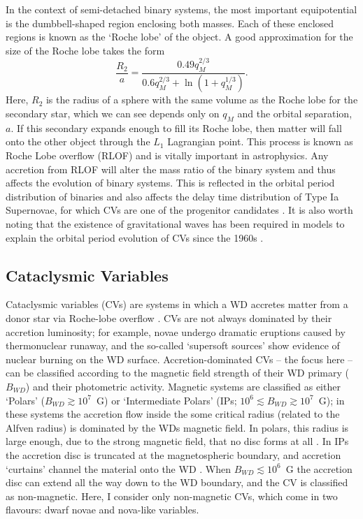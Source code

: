 In the context of semi-detached binary systems, the most important equipotential
is the dumbbell-shaped region enclosing both masses. Each of these
enclosed regions is known as the `Roche lobe' of the object. A good approximation
for the size of the Roche lobe takes the form \citep{eggleton1983}
\begin{equation}
\frac{R_2}{a} = \frac{0.49 q_M^{2/3}}{0.6q_M^{2/3} + \ln(1+q_M^{1/3})}.
\label{eq:roche2}
\end{equation} 
Here, $R_2$ is the radius of a sphere with the same volume as the Roche lobe for the
secondary star, which we can see depends only on $q_M$ and the orbital separation, 
$a$. If this secondary expands enough to fill its Roche lobe, then matter
will fall onto the other object through the $L_1$ Lagrangian point. 
This process is known as Roche Lobe overflow (RLOF)
and is vitally important in astrophysics. 
Any accretion from RLOF will alter the mass ratio of the binary system 
and thus affects the evolution of binary systems. 
This is reflected in the orbital period
distribution of binaries \citep[e.g.][]{knigge2011_evo} 
and also affects the delay time distribution
of Type Ia Supernovae, for which CVs are one of the progenitor candidates 
\citep[e.g.][]{wang2012}.
It is also worth noting that the existence of gravitational waves has been 
required in models to explain the orbital period evolution of CVs since
the 1960s \citep{kraft1962}. 


\subsection{Cataclysmic Variables}

Cataclysmic variables (CVs) are systems in which a WD
accretes matter from a donor star via Roche-lobe overflow 
\citep[see the `CV bible', ][]{warnerbook}. 
CVs are not always dominated by their accretion luminosity; 
for example, novae undergo dramatic eruptions caused
by thermonuclear runaway, and the so-called `supersoft sources' show evidence
of nuclear burning on the WD surface.
Accretion-dominated CVs -- the focus here -- can be classified according to the 
magnetic field strength of their WD primary ($B_{WD} $) and their 
photometric activity. 
Magnetic systems are classified as either `Polars' ($B_{WD} \gtrsim 10^7$~G)
or `Intermediate Polars' (IPs; $10^6 \lesssim B_{WD}  \gtrsim 10^7$~G);
in these systems the accretion flow inside the some critical radius 
(related to the Alfven radius)
is dominated by the WDs magnetic field. 
In polars, this radius is large enough, due to the strong magnetic field,
that no disc forms at all \citep{liebert1985}. In IPs the accretion
disc is truncated at the magnetospheric boundary, and accretion `curtains'
channel the material onto the WD \citep[e.g.][]{patterson1994,evans2004}.
When $B_{WD} \lesssim 10^6$~G the accretion disc can extend all the
way down to the WD boundary, and the CV is classified as non-magnetic.
Here, I consider only non-magnetic CVs, which come in two flavours:
dwarf novae and nova-like variables.

